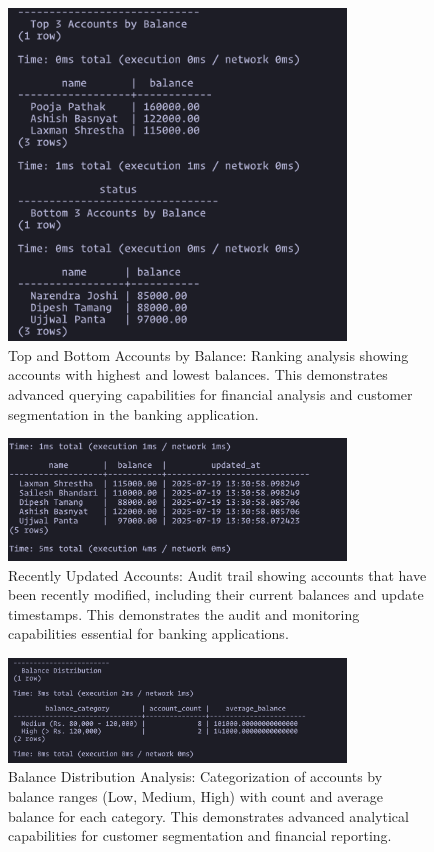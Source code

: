 \begin{figure}[H]
  \centering
  \includegraphics[width=0.8\textwidth]{task-5/screenshots/top-bottom-accounts.png}
  \caption{Top and Bottom Accounts by Balance: Ranking analysis showing accounts with highest and lowest balances. This demonstrates advanced querying capabilities for financial analysis and customer segmentation in the banking application.}
  \label{fig:task5-top-bottom-accounts}
\end{figure}

\begin{figure}[H]
  \centering
  \includegraphics[width=0.8\textwidth]{task-5/screenshots/recently-updated-accounts.png}
  \caption{Recently Updated Accounts: Audit trail showing accounts that have been recently modified, including their current balances and update timestamps. This demonstrates the audit and monitoring capabilities essential for banking applications.}
  \label{fig:task5-recently-updated-accounts}
\end{figure}

\begin{figure}[H]
  \centering
  \includegraphics[width=0.8\textwidth]{task-5/screenshots/balance-distribution.png}
  \caption{Balance Distribution Analysis: Categorization of accounts by balance ranges (Low, Medium, High) with count and average balance for each category. This demonstrates advanced analytical capabilities for customer segmentation and financial reporting.}
  \label{fig:task5-balance-distribution}
\end{figure}